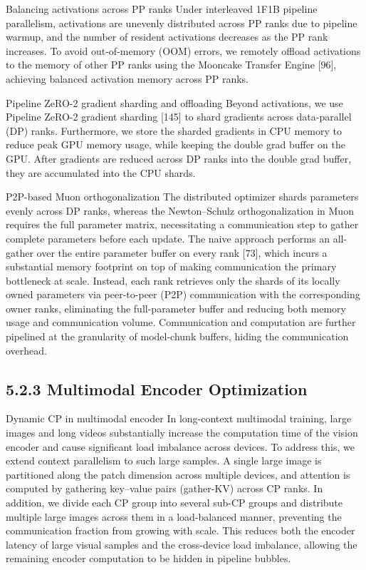 \documentclass[
  10
]{article}
\begin{document}
Balancing activations across PP ranks Under interleaved 1F1B pipeline
parallelism, activations are unevenly distributed across PP ranks due to
pipeline warmup, and the number of resident activations decreases as the
PP rank increases. To avoid out-of-memory (OOM) errors, we remotely
offload activations to the memory of other PP ranks using the Mooncake
Transfer Engine {[}96{]}, achieving balanced activation memory across PP
ranks.

Pipeline ZeRO-2 gradient sharding and offloading Beyond activations, we
use Pipeline ZeRO-2 gradient sharding {[}145{]} to shard gradients
across data-parallel (DP) ranks. Furthermore, we store the sharded
gradients in CPU memory to reduce peak GPU memory usage, while keeping
the double grad buffer on the GPU. After gradients are reduced across DP
ranks into the double grad buffer, they are accumulated into the CPU
shards.

P2P-based Muon orthogonalization The distributed optimizer shards
parameters evenly across DP ranks, whereas the Newton--Schulz
orthogonalization in Muon requires the full parameter matrix,
necessitating a communication step to gather complete parameters before
each update. The naive approach performs an all-gather over the entire
parameter buffer on every rank {[}73{]}, which incurs a substantial
memory footprint on top of making communication the primary bottleneck
at scale. Instead, each rank retrieves only the shards of its locally
owned parameters via peer-to-peer (P2P) communication with the
corresponding owner ranks, eliminating the full-parameter buffer and
reducing both memory usage and communication volume. Communication and
computation are further pipelined at the granularity of model-chunk
buffers, hiding the communication overhead.

\subsection{5.2.3 Multimodal Encoder
Optimization}\label{multimodal-encoder-optimization}

Dynamic CP in multimodal encoder In long-context multimodal training,
large images and long videos substantially increase the computation time
of the vision encoder and cause significant load imbalance across
devices. To address this, we extend context parallelism to such large
samples. A single large image is partitioned along the patch dimension
across multiple devices, and attention is computed by gathering
key--value pairs (gather-KV) across CP ranks. In addition, we divide
each CP group into several sub-CP groups and distribute multiple large
images across them in a load-balanced manner, preventing the
communication fraction from growing with scale. This reduces both the
encoder latency of large visual samples and the cross-device load
imbalance, allowing the remaining encoder computation to be hidden in
pipeline bubbles.
\end{document}
